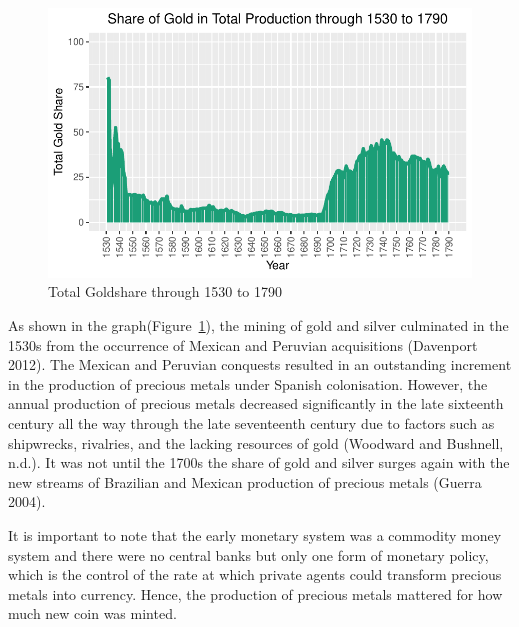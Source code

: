 \documentclass[
  letterpaper,
  DIV=11,
  numbers=noendperiod]{scrartcl}
\begin{document}
\begin{figure}

{\centering \includegraphics{paper_files/figure-pdf/fig-goldshare-1.pdf}

}

\caption{\label{fig-goldshare}Total Goldshare through 1530 to 1790}

\end{figure}

\newpage

As shown in the graph(Figure~\ref{fig-goldshare}), the mining of gold
and silver culminated in the 1530s from the occurrence of Mexican and
Peruvian acquisitions (Davenport 2012). The Mexican and Peruvian
conquests resulted in an outstanding increment in the production of
precious metals under Spanish colonisation. However, the annual
production of precious metals decreased significantly in the late
sixteenth century all the way through the late seventeenth century due
to factors such as shipwrecks, rivalries, and the lacking resources of
gold (Woodward and Bushnell, n.d.). It was not until the 1700s the share
of gold and silver surges again with the new streams of Brazilian and
Mexican production of precious metals (Guerra 2004).

It is important to note that the early monetary system was a commodity
money system and there were no central banks but only one form of
monetary policy, which is the control of the rate at which private
agents could transform precious metals into currency. Hence, the
production of precious metals mattered for how much new coin was minted.
\end{document}
